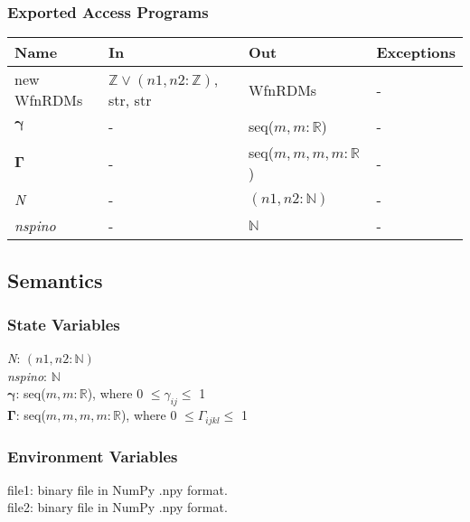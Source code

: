 \documentclass[12pt, titlepage]{article}
\begin{document}
\subsubsection{Exported Access Programs}

\begin{center}
	\begin{tabular}{p{3cm} p{4cm} p{4cm} p{2cm}}
		\hline
		\textbf{Name} & \textbf{In} & \textbf{Out} & \textbf{Exceptions} \\
		\hline
		new WfnRDMs& $\mathbb{Z} \lor (n1, n2:\mathbb{Z})$, str, 
		str& WfnRDMs& -\\
		$\boldsymbol{\gamma}$& -& seq($m,m:\mathbb{R}$)& -\\
		$\boldsymbol{\Gamma}$& -& seq($m,m,m,m:\mathbb{R}$)& -\\
		\textit{N} & -& $(n1, n2:\mathbb{N})$& -\\
		\textit{nspino} & -& $\mathbb{N}$& -\\
		\hline
	\end{tabular}
\end{center}

\subsection{Semantics}

\subsubsection{State Variables}

\textit{N}: $(n1, n2:\mathbb{N})$\\
\textit{nspino}: $\mathbb{N}$\\
$\boldsymbol{\gamma}$: seq($m,m:\mathbb{R}$), where 0 $\le \gamma_{ij} \le$ 1\\
$\boldsymbol{\Gamma}$: seq($m,m,m,m:\mathbb{R}$), where 0 $\le \Gamma_{ijkl} 
\le$ 1\\

\subsubsection{Environment Variables}

file1: binary file in NumPy .npy format.\\
file2: binary file in NumPy .npy format.
\end{document}
